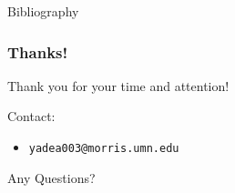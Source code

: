 \documentclass{beamer}
\newcommand{\linespace}{\vskip 0.25cm}
\begin{document}
\begin{frame}[allowframebreaks]{Bibliography} 


\end{frame}

\begin{frame}
	\frametitle{Thanks!}
	
	Thank you for your time and attention!
		
	\linespace
	\linespace
	
	Contact:  
	\begin{itemize}
		\item \texttt{yadea003@morris.umn.edu}
	\end{itemize}
	
	\linespace
	\linespace
	
	\begin{center}
	{\huge Any Questions?}
	\end{center}
\end{frame}
\end{document}
